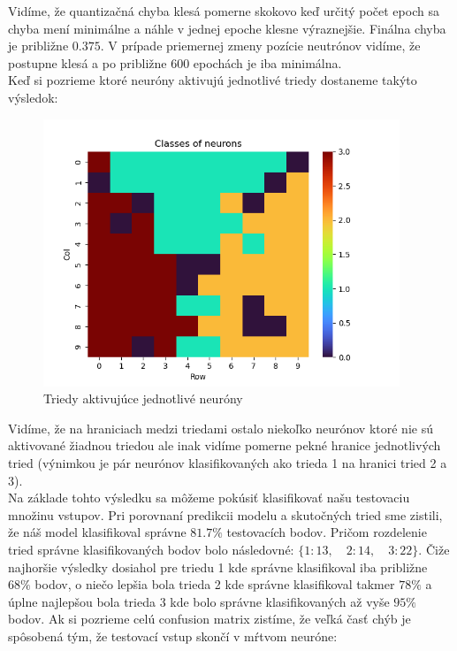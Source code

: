 \documentclass[a4paper]{article}
\begin{document}
	Vidíme, že quantizačná chyba klesá pomerne skokovo keď určitý počet epoch sa chyba mení minimálne a náhle v jednej epoche klesne výraznejšie. Finálna chyba je približne $0.375$. V prípade priemernej zmeny pozície neutrónov vidíme, že postupne klesá a po približne 600 epochách je iba minimálna.
	\\
	
	Keď si pozrieme ktoré neuróny aktivujú jednotlivé triedy dostaneme takýto výsledok:
	
	\begin{figure}[!h]
		\centering
		\includegraphics[width=0.95\textwidth]{../class_neur.png}
		\caption{Triedy aktivujúce jednotlivé neuróny}
	\end{figure}
	
	Vidíme, že na hraniciach medzi triedami ostalo niekoľko neurónov ktoré nie sú aktivované žiadnou triedou ale inak vidíme pomerne pekné hranice jednotlivých tried (výnimkou je pár neurónov klasifikovaných ako trieda 1 na hranici tried 2 a 3).
	\\
	
	Na základe tohto výsledku sa môžeme pokúsiť klasifikovať našu testovaciu množinu vstupov. Pri porovnaní predikcii modelu a skutočných tried sme zistili, že náš model klasifikoval správne $81.7\%$ testovacích bodov. Pričom rozdelenie tried správne klasifikovaných bodov bolo následovné: $\{1: 13,\quad 2: 14,\quad 3: 22\}$. Čiže najhoršie výsledky dosiahol pre triedu 1 kde správne klasifikoval iba približne $68\%$ bodov, o niečo lepšia bola trieda 2 kde správne klasifikoval takmer $78\%$ a úplne najlepšou bola trieda 3 kde bolo správne klasifikovaných až vyše $95\%$ bodov. Ak si pozrieme celú confusion matrix zistíme, že veľká časť chýb je spôsobená tým, že testovací vstup skončí v mŕtvom neuróne:
	
\end{document}
